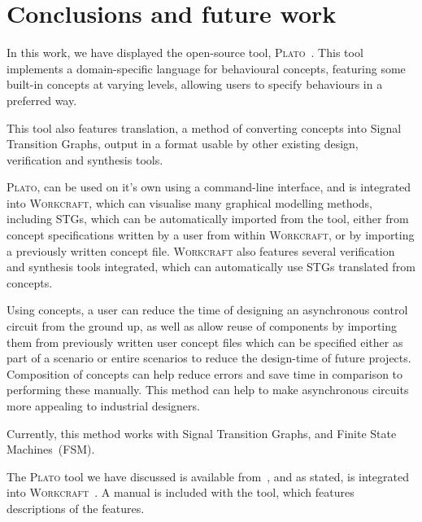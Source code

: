 \documentclass[british,conference,compsoc]{IEEEtran}
\newcommand{\noun}[1]{\textsc{#1}}
\begin{document}
\section{Conclusions and future work\label{sec:conclusions}}

\vspace{-3mm}

In this work, we have displayed the open-source
tool, \noun{Plato}~\cite{2016_concepts_github}. This tool implements a 
domain-specific language for behavioural concepts, featuring some built-in 
concepts at varying levels, allowing users to specify behaviours in a preferred 
way. 

This tool also features translation, a method of converting concepts into Signal
Transition Graphs, output in a format usable by other existing design, 
verification and synthesis tools. 

\noun{Plato}, can be used on it's own using a command-line interface, and is
integrated into \noun{Workcraft}, which can visualise many graphical modelling
methods, including STGs, which can be automatically imported from the
tool, either from concept specifications written by a user from within 
\noun{Workcraft}, or by importing a previously written concept file.
\noun{Workcraft} also features several verification and synthesis tools 
integrated, which can automatically use STGs translated from concepts. 

Using concepts, a user can reduce the time of designing an asynchronous
control circuit from the ground up, as well as allow reuse of components
by importing them from previously written user concept files which can be 
specified either as part of a scenario or entire scenarios to reduce the 
design-time of future projects. Composition of concepts can help
reduce errors and save time in comparison to performing these manually.
This method can help to make asynchronous circuits more appealing
to industrial designers.

Currently, this method works with Signal Transition Graphs, and
Finite State Machines~(FSM).

The \noun{Plato} tool we have discussed is available 
from~\cite{2016_concepts_github}, and as stated, is integrated into 
\noun{Workcraft}~\cite{Workcraft_website}. A manual is included with the tool, 
which features descriptions of the features. 



\end{document}
